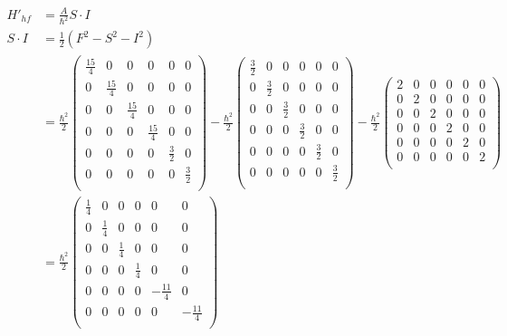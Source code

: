 \documentclass[10pt]{article} %
\begin{document}
\begin{align*}
  H'_{hf} &= \frac{A}{\hbar^2}S\cdot I\\
  S\cdot I &= \frac{1}{2}\left(F^2 - S^2 - I^2\right)\\
  &=
  \frac{\hbar^2}{2}
  \begin{pmatrix}
    \frac{15}{4} & 0 & 0 & 0 & 0 & 0\\
    0 & \frac{15}{4} & 0 & 0 & 0 & 0\\
    0 & 0 & \frac{15}{4} & 0 & 0 & 0\\
    0 & 0 & 0 & \frac{15}{4} & 0 & 0\\
    0 & 0 & 0 & 0 & \frac{3}{2} & 0\\
    0 & 0 & 0 & 0 & 0 & \frac{3}{2}\\
  \end{pmatrix}
  -
  \frac{\hbar^2}{2}
  \begin{pmatrix}
    \frac{3}{2} & 0 & 0 & 0 & 0 & 0\\
    0 & \frac{3}{2} & 0 & 0 & 0 & 0\\
    0 & 0 & \frac{3}{2} & 0 & 0 & 0\\
    0 & 0 & 0 & \frac{3}{2} & 0 & 0\\
    0 & 0 & 0 & 0 & \frac{3}{2} & 0\\
    0 & 0 & 0 & 0 & 0 & \frac{3}{2}\\
  \end{pmatrix}
  -
  \frac{\hbar^2}{2}
  \begin{pmatrix}
    2 & 0 & 0 & 0 & 0 & 0\\
    0 & 2 & 0 & 0 & 0 & 0\\
    0 & 0 & 2 & 0 & 0 & 0\\
    0 & 0 & 0 & 2 & 0 & 0\\
    0 & 0 & 0 & 0 & 2 & 0\\
    0 & 0 & 0 & 0 & 0 & 2\\
  \end{pmatrix}\\
  &= \frac{\hbar^2}{2}
  \begin{pmatrix}
    \frac{1}{4} & 0 & 0 & 0 & 0 & 0\\
    0 & \frac{1}{4} & 0 & 0 & 0 & 0\\
    0 & 0 & \frac{1}{4} & 0 & 0 & 0\\
    0 & 0 & 0 & \frac{1}{4} & 0 & 0\\
    0 & 0 & 0 & 0 & -\frac{11}{4} & 0\\
    0 & 0 & 0 & 0 & 0 & -\frac{11}{4}\\
  \end{pmatrix}\\

\end{align*}
\end{document}
